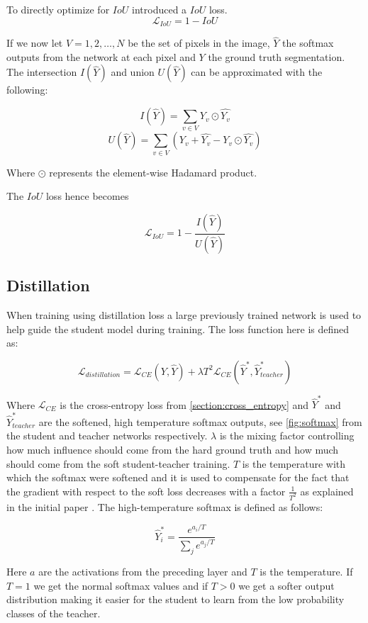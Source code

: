 \documentclass{kththesis}
\begin{document}
To directly optimize for \(IoU\) \textcite{rahman2016optimizing} introduced
a \(IoU\) loss.
\[\mathcal{L}_{IoU} = 1 - IoU\]

If we now let \(V = {1, 2, \dots, N}\) be the set of pixels in the image, \(\hat{Y}\)
the softmax outputs from the network at each pixel and \(Y\) the ground truth
segmentation. The intersection \(I(\hat{Y})\) and union \(U(\hat{Y})\) can be
approximated with the following:

\[I(\hat{Y}) = \sum_{v \in V} Y_v \odot \hat{Y_v}\]
\[U(\hat{Y}) = \sum_{v \in V}\left( Y_v + \hat{Y_v} - Y_v \odot \hat{Y_v} \right) \]

Where \(\odot\) represents the element-wise Hadamard product.

The \(IoU\) loss hence becomes

\[\mathcal{L}_{IoU} = 1 - \frac{I(\hat{Y})}{U(\hat{Y})}\]


\subsection{Distillation}
When training using distillation loss \parencite{hinton2015distilling} a large
previously trained network is used to help guide the student model during
training. The loss function here is defined as:

\[\mathcal{L}_{distillation} = \mathcal{L}_{CE}(Y, \hat{Y}) + \lambda T^2\mathcal{L}_{CE}(\hat{Y}^*, \hat{Y}_{teacher}^*)\]

Where \(\mathcal{L}_{CE}\) is the cross-entropy loss from
\cref{section:cross_entropy} and \(\hat{Y}^*\) and \(\hat{Y}^*_{teacher}\) are the softened,
high temperature softmax outputs, see \cref{fig:softmax} from the student and teacher networks
respectively. \(\lambda\) is the mixing factor controlling how much influence
should come from the hard ground truth and how much should come from the soft
student-teacher training. \(T\) is the temperature with which the softmax were softened and
it is used to compensate for the fact that the gradient with respect to the soft
loss decreases with a factor \(\frac{1}{T^2}\) as explained in the initial
paper \parencite{hinton2015distilling}. The high-temperature softmax is defined
as follows: 

\[\hat{Y}_i^* = \frac{e^{a_i/T}}{\sum_j e^{a_j/T}}\]

Here \(a\) are the activations from the preceding layer and \(T\) is the
temperature. If \(T = 1\) we get the normal softmax values and if \(T > 0\) we
get a softer output distribution making it easier for the student to learn from
the low probability classes of the teacher. 
\end{document}
